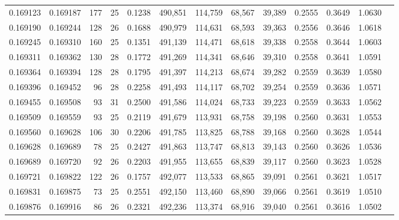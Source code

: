 \begin{tabular}{rrrrrrrrrrrrr}
0.169123 & 0.169187 &   177 &  25 &                                     0.1238 & 490,851 & 114,759 &  68,567 &  39,389 & 0.2555 & 0.3649 & 1.0630 \\
0.169190 & 0.169244 &   128 &  26 &                                     0.1688 & 490,979 & 114,631 &  68,593 &  39,363 & 0.2556 & 0.3646 & 1.0618 \\
0.169245 & 0.169310 &   160 &  25 &                                     0.1351 & 491,139 & 114,471 &  68,618 &  39,338 & 0.2558 & 0.3644 & 1.0603 \\
0.169311 & 0.169362 &   130 &  28 &                                     0.1772 & 491,269 & 114,341 &  68,646 &  39,310 & 0.2558 & 0.3641 & 1.0591 \\
0.169364 & 0.169394 &   128 &  28 &                                     0.1795 & 491,397 & 114,213 &  68,674 &  39,282 & 0.2559 & 0.3639 & 1.0580 \\
0.169396 & 0.169452 &    96 &  28 &                                     0.2258 & 491,493 & 114,117 &  68,702 &  39,254 & 0.2559 & 0.3636 & 1.0571 \\
0.169455 & 0.169508 &    93 &  31 &                                     0.2500 & 491,586 & 114,024 &  68,733 &  39,223 & 0.2559 & 0.3633 & 1.0562 \\
0.169509 & 0.169559 &    93 &  25 &                                     0.2119 & 491,679 & 113,931 &  68,758 &  39,198 & 0.2560 & 0.3631 & 1.0553 \\
0.169560 & 0.169628 &   106 &  30 &                                     0.2206 & 491,785 & 113,825 &  68,788 &  39,168 & 0.2560 & 0.3628 & 1.0544 \\
0.169628 & 0.169689 &    78 &  25 &                                     0.2427 & 491,863 & 113,747 &  68,813 &  39,143 & 0.2560 & 0.3626 & 1.0536 \\
0.169689 & 0.169720 &    92 &  26 &                                     0.2203 & 491,955 & 113,655 &  68,839 &  39,117 & 0.2560 & 0.3623 & 1.0528 \\
0.169721 & 0.169822 &   122 &  26 &                                     0.1757 & 492,077 & 113,533 &  68,865 &  39,091 & 0.2561 & 0.3621 & 1.0517 \\
0.169831 & 0.169875 &    73 &  25 &                                     0.2551 & 492,150 & 113,460 &  68,890 &  39,066 & 0.2561 & 0.3619 & 1.0510 \\
0.169876 & 0.169916 &    86 &  26 &                                     0.2321 & 492,236 & 113,374 &  68,916 &  39,040 & 0.2561 & 0.3616 & 1.0502 \\

\end{tabular}
